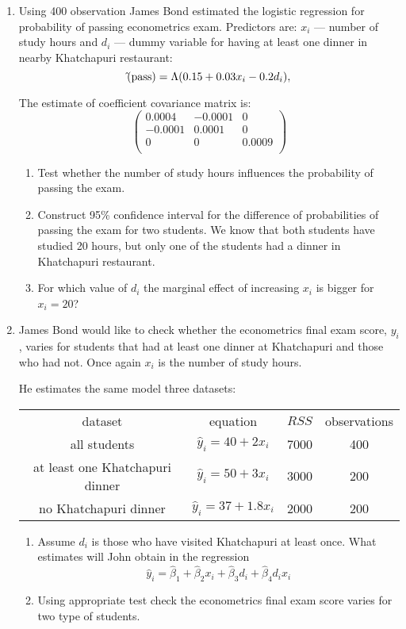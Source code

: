 \documentclass[12pt]{article}
\let\P\relax
\DeclareMathOperator{\P}{\mathbb{P}}
\begin{document}
\begin{enumerate}
\item Using 400 observation James Bond estimated the logistic regression for probability
of passing econometrics exam. Predictors are: $x_i$ — number of study hours and $d_i$ —
dummy variable for having at least one dinner in nearby Khatchapuri restaurant:
\[
\hat \P(\text{pass}) = \Lambda(0.15 + 0.03x_i - 0.2 d_i),
\]

The estimate of coefficient covariance matrix is:
\[
\begin{pmatrix}
0.0004 & -0.0001 & 0 \\
-0.0001 & 0.0001 & 0 \\
0 & 0 & 0.0009 \\
\end{pmatrix}
\]

\begin{enumerate}
  \item Test whether the number of study hours influences the probability of passing the exam.
  \item Construct 95\% confidence interval for the difference of probabilities of passing the exam
	for two students. We know that both students have studied 20 hours, but only one of the students
	had a dinner in Khatchapuri restaurant.
  \item For which value of $d_i$ the marginal effect of increasing $x_i$ is bigger for $x_i = 20$?
\end{enumerate}

\item James Bond would like to check whether the econometrics final exam score, $y_i$, varies for
students that had at least one dinner at Khatchapuri and those who had not. Once again
$x_i$ is the number of study hours.

He estimates the same model three datasets:


\begin{tabular}{cccc}
	\toprule
	dataset & equation & $RSS$ & observations \\
	all students & $\hat y_i = 40 + 2x_i$ & 7000 & 400 \\
	at least one Khatchapuri dinner & $\hat y_i = 50 + 3x_i$ & 3000 & 200 \\
	no Khatchapuri dinner & $\hat y_i = 37 + 1.8x_i$ & 2000 & 200 \\
	\bottomrule
\end{tabular}

\begin{enumerate}
	\item Assume $d_i$ is those who have visited Khatchapuri at least once.
	What estimates will John obtain in the regression
	\[
    \hat y_i = \hat \beta_1 + \hat \beta_2 x_i + \hat \beta_3 d_i + \hat\beta_4 d_i x_i
	\]
	\item Using appropriate test check the econometrics final exam score varies for two type of students.
\end{enumerate}



\end{enumerate}
\end{document}

